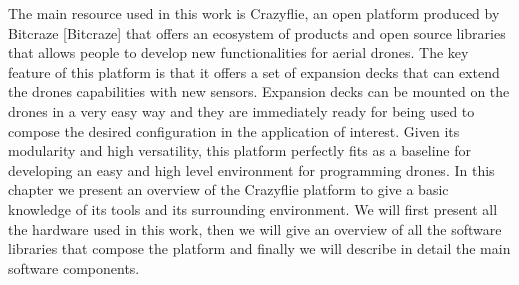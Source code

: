 The main resource used in this work is Crazyflie, an open platform produced by Bitcraze [Bitcraze] that offers an ecosystem of products and open source libraries that allows people to develop new functionalities for aerial drones. The key feature of this platform is that it offers a set of expansion decks that can extend the drones capabilities with new sensors. Expansion decks can be mounted on the drones in a very easy way and they are immediately ready for being used to compose the desired configuration in the application of interest. Given its modularity and high versatility, this platform perfectly fits as a baseline for developing an easy and high level environment for programming drones. In this chapter we present an overview of the Crazyflie platform to give a basic knowledge of its tools and its surrounding environment. We will first present all the hardware used in this work, then we will give an overview of all the software libraries that compose the platform and finally we will describe in detail the main software components.

